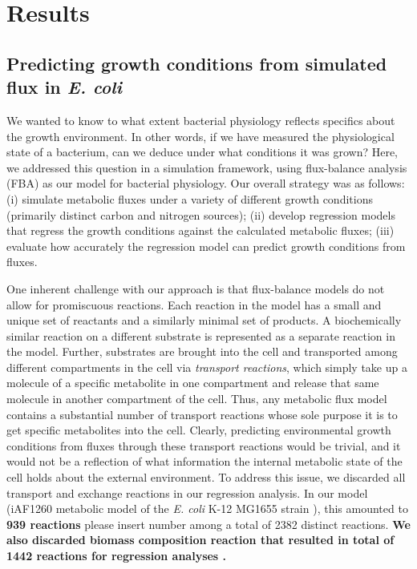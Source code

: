 \documentclass[12pt]{article}
\begin{document}
\section*{Results}

\subsection*{Predicting growth conditions from simulated flux in \emph{E. coli}}

We wanted to know to what extent bacterial physiology reflects specifics about the growth environment. In other words, if we have measured the physiological state of a bacterium, can we deduce under what conditions it was grown? Here, we addressed this question in a simulation framework, using flux-balance analysis (FBA) as our model for bacterial physiology. Our overall strategy was as follows: (i) simulate metabolic fluxes under a variety of different growth conditions (primarily distinct carbon and nitrogen sources); (ii) develop regression models that regress the growth conditions against the calculated metabolic fluxes; (iii) evaluate how accurately the regression model can predict growth conditions from fluxes.

One inherent challenge with our approach is that flux-balance models do not allow for promiscuous reactions. Each reaction in the model has a small and unique set of reactants and a similarly minimal set of products. A biochemically similar reaction on a different substrate is represented as a separate reaction in the model. Further, substrates are brought into the cell and transported among different compartments in the cell via \emph{transport reactions}, which simply take up a molecule of a specific metabolite in one compartment and release that same molecule in another compartment of the cell. Thus, any metabolic flux model contains a substantial number of transport reactions whose sole purpose it is to get specific metabolites into the cell. Clearly, predicting environmental growth conditions from fluxes through these transport reactions would be trivial, and it would not be a reflection of what information the internal metabolic state of the cell holds about the external environment. To address this issue, we discarded all transport and exchange reactions in our regression analysis. In our model (iAF1260 metabolic model of the \emph{E. coli} K-12 MG1655 strain \cite{Schellenbergeretal2010}), this amounted to \textbf{939 reactions} {\color{red}please insert number} among a total of 2382 distinct reactions. \textbf{We also discarded biomass composition reaction that resulted in total of 1442 reactions for regression analyses .}
\end{document}
